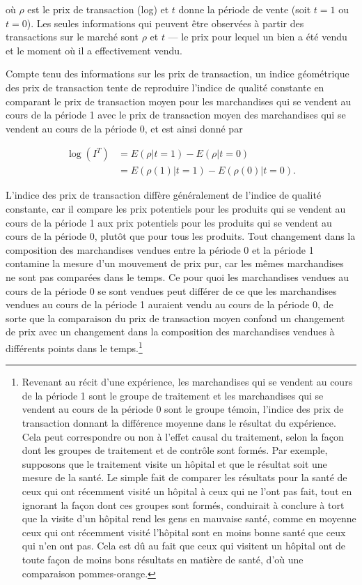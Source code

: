 \documentclass[]{article}
\begin{document}
où \(\rho\) est le prix de transaction (log) et \(t\) donne la période de vente (soit \(t = 1\) ou \(t = 0\)). Les seules informations qui peuvent être observées à partir des transactions sur le marché sont \(\rho\) et \(t\) --- le prix pour lequel un bien a été vendu et le moment où il a effectivement vendu.

Compte tenu des informations sur les prix de transaction, un indice géométrique des prix de transaction tente de reproduire l'indice de qualité constante en comparant le prix de transaction moyen pour les marchandises qui se vendent au cours de la période 1 avec le prix de transaction moyen des marchandises qui se vendent au cours de la période 0, et est ainsi donné par

\begin{align*}
\log (I^{T}) &= E(\rho | t = 1) - E(\rho | t = 0) \\
&= E(\rho(1) | t = 1) - E(\rho(0) | t = 0).
\end{align*}

L'indice des prix de transaction diffère généralement de l'indice de qualité constante, car il compare les prix potentiels pour les produits qui se vendent au cours de la période 1 aux prix potentiels pour les produits qui se vendent au cours de la période 0, plutôt que pour tous les produits. Tout changement dans la composition des marchandises vendues entre la période 0 et la période 1 contamine la mesure d'un mouvement de prix pur, car les mêmes marchandises ne sont pas comparées dans le temps. Ce pour quoi les marchandises vendues au cours de la période 0 se sont vendues peut différer de ce que les marchandises vendues au cours de la période 1 auraient vendu au cours de la période 0, de sorte que la comparaison du prix de transaction moyen confond un changement de prix avec un changement dans la composition des marchandises vendues à différents points dans le temps.\footnote{Revenant au récit d'une expérience, les marchandises qui se vendent au cours de la période 1 sont le groupe de traitement et les marchandises qui se vendent au cours de la période 0 sont le groupe témoin, l'indice des prix de transaction donnant la différence moyenne dans le résultat du expérience. Cela peut correspondre ou non à l'effet causal du traitement, selon la façon dont les groupes de traitement et de contrôle sont formés. Par exemple, supposons que le traitement visite un hôpital et que le résultat soit une mesure de la santé. Le simple fait de comparer les résultats pour la santé de ceux qui ont récemment visité un hôpital à ceux qui ne l'ont pas fait, tout en ignorant la façon dont ces groupes sont formés, conduirait à conclure à tort que la visite d'un hôpital rend les gens en mauvaise santé, comme en moyenne ceux qui ont récemment visité l'hôpital sont en moins bonne santé que ceux qui n'en ont pas. Cela est dû au fait que ceux qui visitent un hôpital ont de toute façon de moins bons résultats en matière de santé, d'où une comparaison pommes-orange.}
\end{document}

